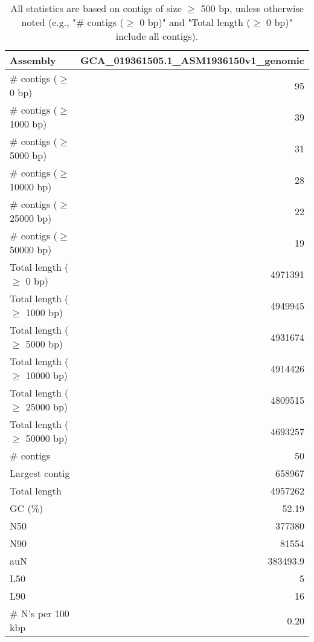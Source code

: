 \documentclass[12pt,a4paper]{article}
\begin{document}
\begin{table}[ht]
\begin{center}
\caption{All statistics are based on contigs of size $\geq$ 500 bp, unless otherwise noted (e.g., "\# contigs ($\geq$ 0 bp)" and "Total length ($\geq$ 0 bp)" include all contigs).}
\begin{tabular}{|l*{1}{|r}|}
\hline
Assembly & GCA\_019361505.1\_ASM1936150v1\_genomic \\ \hline
\# contigs ($\geq$ 0 bp) & 95 \\ \hline
\# contigs ($\geq$ 1000 bp) & 39 \\ \hline
\# contigs ($\geq$ 5000 bp) & 31 \\ \hline
\# contigs ($\geq$ 10000 bp) & 28 \\ \hline
\# contigs ($\geq$ 25000 bp) & 22 \\ \hline
\# contigs ($\geq$ 50000 bp) & 19 \\ \hline
Total length ($\geq$ 0 bp) & 4971391 \\ \hline
Total length ($\geq$ 1000 bp) & 4949945 \\ \hline
Total length ($\geq$ 5000 bp) & 4931674 \\ \hline
Total length ($\geq$ 10000 bp) & 4914426 \\ \hline
Total length ($\geq$ 25000 bp) & 4809515 \\ \hline
Total length ($\geq$ 50000 bp) & 4693257 \\ \hline
\# contigs & 50 \\ \hline
Largest contig & 658967 \\ \hline
Total length & 4957262 \\ \hline
GC (\%) & 52.19 \\ \hline
N50 & 377380 \\ \hline
N90 & 81554 \\ \hline
auN & 383493.9 \\ \hline
L50 & 5 \\ \hline
L90 & 16 \\ \hline
\# N's per 100 kbp & 0.20 \\ \hline
\end{tabular}
\end{center}
\end{table}
\end{document}
